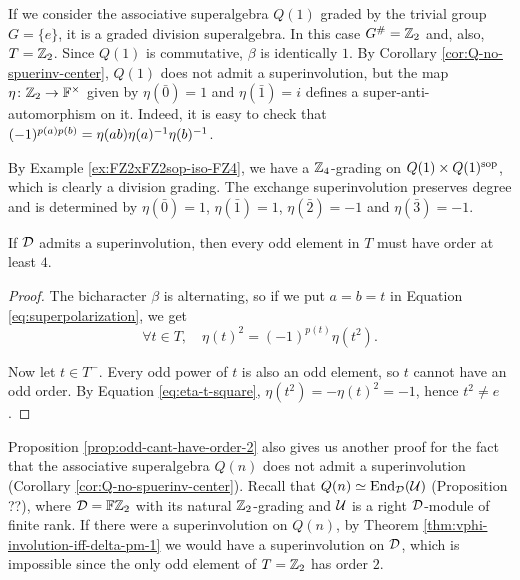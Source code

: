 \begin{ex}
    If we consider the associative superalgebra $Q(1)$ graded by the trivial group $G = \{e\}$, it is a graded division superalgebra. 
    In this case $G^\# = \mathbb{Z}_2$ and, also, $T = \mathbb{Z}_2$. 
    Since $Q(1)$ is commutative, $\beta$ is identically $1$.
    By Corollary \ref{cor:Q-no-spuerinv-center}, $Q(1)$ does not admit a superinvolution, but the map $\eta\colon \mathbb{Z}_2 \to \mathbb{F}^\times$ given by $\eta (\bar 0) = 1$ and $\eta( \bar 1) = i$ defines a super-anti-automorphism on it. 
    Indeed, it is easy to check that $(-1)^{p(a) p(b)} =  \eta(ab) \eta(a)^{-1} \eta(b)^{-1}$.
\end{ex}

\begin{ex}
    By Example \ref{ex:FZ2xFZ2sop-iso-FZ4}, we have a $\mathbb{Z}_4$-grading on $Q(1)\times Q(1)^{\mathrm{sop}}$, which is clearly a division grading. 
    The exchange superinvolution preserves degree and is determined by $\eta (\bar 0) = 1$, $\eta (\bar 1) = 1$, $\eta (\bar 2) = -1$ and $\eta (\bar 3) = -1$.
\end{ex}

\begin{prop}\label{prop:odd-cant-have-order-2}
    If $\mathcal{D}$ admits a superinvolution, %
    then every odd element in $T$ must have order at least $4$.
\end{prop}

\begin{proof}
    The bicharacter $\beta$ is alternating, so if we put $a = b = t$ in Equation \eqref{eq:superpolarization}, we get
    \begin{equation}\label{eq:eta-t-square}
        \forall t\in T, \quad \eta (t)^2 = (-1)^{p(t)} \eta(t^2).
    \end{equation}
    
    Now let $t\in T^-$. 
    Every odd power of $t$ is also an odd element, so $t$ cannot have an odd order. 
    By Equation \eqref{eq:eta-t-square}, $\eta (t^2) = - \eta(t)^2 = -1$, hence $t^2 \neq e$.
\end{proof}

\begin{remark}
    Proposition \ref{prop:odd-cant-have-order-2} also gives us another proof for the fact that the associative superalgebra $Q(n)$ does not admit a superinvolution (Corollary \ref{cor:Q-no-spuerinv-center}). 
    Recall that $Q(n) \simeq \operatorname{End}_{\mathcal{D}} (\mathcal U)$ (Proposition ??), where $\mathcal{D}= \mathbb{F}\mathbb{Z}_2$ with its natural $\mathbb{Z}_2$-grading and $\mathcal U$ is a right $\mathcal{D}$-module of finite rank. 
    If there were a superinvolution on $Q(n)$, by Theorem \ref{thm:vphi-involution-iff-delta-pm-1} we would have a superinvolution on $\mathcal{D}$, which is impossible since the only odd element of $T = \mathbb{Z}_2$ has order $2$. 
\end{remark}

